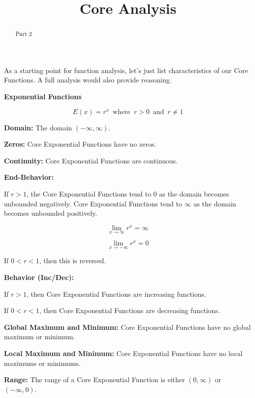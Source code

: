 \documentclass{ximera}
\title{Core Analysis}
\begin{document}
\begin{abstract}
Part 2
\end{abstract}
\maketitle




As a starting point for function analysis, let's just list characteristics of our Core Functions. A full analysis would also provide reasoning.


\begin{explanation} \textbf{\textcolor{red!75!green}{Exponential Functions}} 


\[ E(x) = r^x  \, \text{ where } \, r > 0  \, \text{ and } \, r \ne 1 \]



\textbf{Domain:} The domain $(-\infty, \infty)$.

\textbf{Zeros:} Core Exponential Functions have no zeros.



\textbf{Continuity:} Core Exponential Functions are continuous.



\textbf{End-Behavior:} 



If $r > 1$, the Core Exponential Functions tend to $0$ as the domain becomes unbounded negatively. Core Exponential Functions tend to $\infty$ as the domain becomes unbounded positively.



\[
\lim\limits_{x \to \infty} r^x = \infty
\]


\[
\lim\limits_{x \to -\infty} r^x = 0
\]


If $0 < r < 1$, then this is reversed.



\textbf{Behavior (Inc/Dec):} 


If $r > 1$, then Core Exponential Functions are increasing functions.

If $0 < r < 1$, then Core Exponential Functions are decreasing functions.





\textbf{Global Maximum and Minimum:} Core Exponential Functions have no global maximum or minimum.

\textbf{Local Maximum and Minimum:}  Core Exponential Functions have no local maximums or minimums.

\textbf{Range:} The range of a Core Exponential Function is either $(0,\infty)$ or $(-\infty, 0)$.

\end{explanation}
\end{document}
